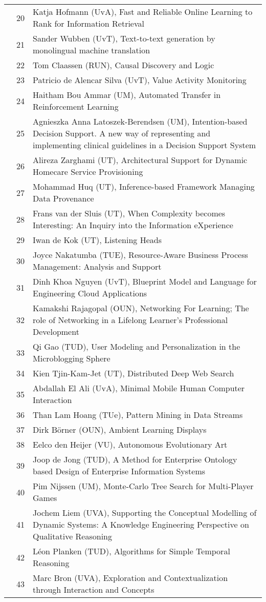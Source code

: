 \begin{longtabu}{@{}l@{ }l@{\hspace{1em}}X}
	&	 20	&	 Katja Hofmann (UvA), Fast and Reliable Online Learning to Rank for Information Retrieval\\
	&	 21	&	 Sander Wubben (UvT), Text-to-text generation by monolingual machine translation\\
	&	 22	&	 Tom Claassen (RUN), Causal Discovery and Logic\\
	&	 23	&	 Patricio de Alencar Silva (UvT), Value Activity Monitoring\\
	&	 24	&	 Haitham Bou Ammar (UM), 	Automated Transfer in Reinforcement Learning\\
	&	 25	&	 Agnieszka Anna Latoszek-Berendsen (UM), 	Intention-based Decision Support. A new way of representing and implementing clinical guidelines in a Decision Support System\\
	&	 26	&	 Alireza Zarghami (UT), 	Architectural Support for Dynamic Homecare Service Provisioning\\
	&	 27	&	 Mohammad Huq (UT), 	Inference-based Framework Managing Data Provenance\\
	&	 28	&	 Frans van der Sluis (UT), 	When Complexity becomes Interesting: An Inquiry into the Information eXperience\\
	&	 29	&	 Iwan de Kok (UT), 	Listening Heads\\
	&	 30	&	 Joyce Nakatumba (TUE), 	Resource-Aware Business Process Management: Analysis and Support\\
	&	 31	&	 Dinh Khoa Nguyen (UvT), 	Blueprint Model and Language for Engineering Cloud Applications\\
	&	 32	&	 Kamakshi Rajagopal (OUN), 	Networking For Learning; The role of Networking in a Lifelong Learner's Professional Development\\
	&	 33	&	 Qi Gao (TUD), User Modeling and Personalization in the Microblogging Sphere\\
	&	 34	&	 Kien Tjin-Kam-Jet (UT), 	Distributed Deep Web Search\\
	&	 35	&	 Abdallah El Ali (UvA), Minimal Mobile Human Computer Interaction\\
	&	 36	&	 Than Lam Hoang (TUe), 	Pattern Mining in Data Streams\\
	&	 37	&	 Dirk B\"{o}rner (OUN), Ambient Learning Displays\\
	&	 38	&	 Eelco den Heijer (VU), 	Autonomous Evolutionary Art\\
	&	 39	&	 Joop de Jong (TUD), A Method for Enterprise Ontology based Design of Enterprise Information Systems\\
	&	 40	&	 Pim Nijssen (UM), Monte-Carlo Tree Search for Multi-Player Games\\
	&	 41	&	 Jochem Liem (UVA), Supporting the Conceptual Modelling of Dynamic Systems: A Knowledge Engineering Perspective on Qualitative Reasoning\\
	&	 42	&	 L\'{e}on Planken (TUD), Algorithms for Simple Temporal Reasoning\\
	&	 43	&	 Marc Bron (UVA), Exploration and Contextualization through Interaction and Concepts\\


\end{longtabu}
